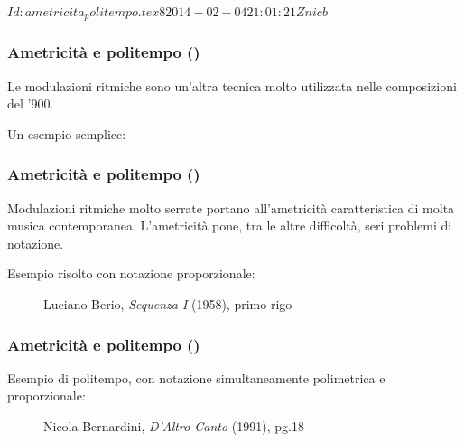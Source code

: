 %
%
\svnInfo $Id: ametricita_politempo.tex 8 2014-02-04 21:01:21Z nicb $

\setcounter{ms}{0}
\begin{frame}
    \frametitle{Ametricit\`a e politempo ()}

    Le modulazioni ritmiche sono un'altra tecnica
    molto utilizzata nelle composizioni del '900.

    Un esempio semplice:

    \begin{center}
    \end{center}

\end{frame}

\begin{frame}
    \frametitle{Ametricit\`a e politempo ()}

    Modulazioni ritmiche molto serrate portano
    all'ametricit\`a caratteristica di molta
    musica contemporanea.
    L'ametricit\`a pone, tra le altre difficolt\`a,
    seri problemi di notazione.

    Esempio risolto con notazione proporzionale:

    \begin{center}
        \begin{figure}
            \caption{Luciano Berio, \emph{Sequenza I} (1958), primo rigo}
        \end{figure}
    \end{center}

\end{frame}

\begin{frame}
    \frametitle{Ametricit\`a e politempo ()}

    Esempio di politempo,
    con notazione simultaneamente polimetrica
    e proporzionale:

    \begin{figure}
        \begin{center}
            \caption{Nicola Bernardini, \emph{D'Altro Canto} (1991), pg.18}
        \end{center}
    \end{figure}

\end{frame}

